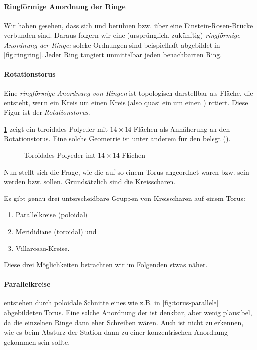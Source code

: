 \paragraph{Ringförmige Anordnung der Ringe}
Wir haben gesehen, dass sich  und  berühren bzw. über eine Einstein-Rosen-Brücke verbunden sind. Daraus folgern wir eine (ursprünglich, zukünftig) \emph{ringförmige Anordnung der Ringe;} solche Ordnungen sind beispielhaft abgebildet in \cref{fig:ringring}. Jeder Ring tangiert unmittelbar jeden benachbarten Ring.



\paragraph{Rotationstorus}
Eine \emph{ringförmige Anordnung von Ringen }ist topologisch darstellbar als Fläche, die entsteht, wenn ein Kreis um einen Kreis (also quasi ein  um einen ) rotiert. Diese Figur ist der \emph{Rotationstorus}.

\cref{fig:torusweiss}  zeigt ein toroidales Polyeder mit $14\times 14$ Flächen als Annäherung an den Rotationstorus. Eine solche Geometrie ist unter anderem für den  belegt (\cite[S.32f.]{cbasebook}).

\begin{figure}[ht!]
    \centering
    
    \caption{Toroidales Polyeder imt $14\times 14$ Flächen} 
    \label{fig:torusweiss}
\end{figure}

Nun stellt sich die Frage, wie die  auf so einem Torus angeordnet waren bzw. sein werden bzw. sollen. 
Grundsätzlich sind die  Kreisscharen. 

\parbox{\textwidth}{
    Es gibt genau drei unterscheidbare Gruppen von Kreisscharen auf einem Torus: 
    \begin{enumerate}
        \item Parallelkreise (poloidal)
        \item Merididiane (toroidal) und 
        \item Villarceau-Kreise.
    \end{enumerate}
    }
Diese drei Möglichkeiten betrachten wir im Folgenden etwas näher.

\paragraph{Parallelkreise} entstehen durch poloidale Schnitte eines wie z.B. in \cref{fig:torus-parallele} abgebildeten Torus. Eine solche Anordnung der  ist denkbar, aber wenig plausibel, da die einzelnen Ringe dann eher Schreiben wären. Auch ist nicht zu erkennen, wie es beim Absturz der Station dann zu einer konzentrischen Anordnung gekommen sein sollte. 

